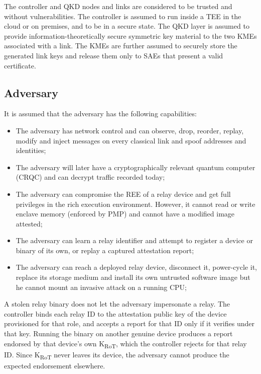 \documentclass[futureinternet,article,submit,moreauthors]{Definitions/mdpi}
\begin{document}
The controller and QKD nodes and links are considered to be trusted and without vulnerabilities. The controller is assumed to run inside a TEE in the cloud or on premises, and to be in a secure state. The QKD layer is assumed to provide information-theoretically secure symmetric key material to the two KMEs associated with a link. The KMEs are further assumed to securely store the generated link keys and release them only to SAEs that present a valid certificate.

\subsection{Adversary}\label{sec:adversary}

It is assumed that the adversary has the following capabilities:

\begin{itemize}[leftmargin=*,labelsep=5.8mm]
\item The adversary has network control and can observe, drop, reorder, replay, modify and inject messages on every classical link and spoof addresses and identities;
\item The adversary will later have a cryptographically relevant quantum computer (CRQC) and can decrypt traffic recorded today;
\item The adversary can compromise the REE of a relay device and get full privileges in the rich execution environment. However, it cannot read or write enclave memory (enforced by PMP) and cannot have a modified image attested;
\item The adversary can learn a relay identifier and attempt to register a device or binary of its own, or replay a captured attestation report;
\item The adversary can reach a deployed relay device, disconnect it, power-cycle it, replace its storage medium and install its own untrusted software image but he cannot mount an invasive attack on a running CPU;
\end{itemize}

A stolen relay binary does not let the adversary impersonate a relay. The controller binds each relay ID to the attestation public key of the device provisioned for that role, and accepts a report for that ID only if it verifies under that key. Running the binary on another genuine device produces a report endorsed by that device's own K\textsubscript{RoT}, which the controller rejects for that relay ID. Since K\textsubscript{RoT} never leaves its device, the adversary cannot produce the expected endorsement elsewhere.
\end{document}
